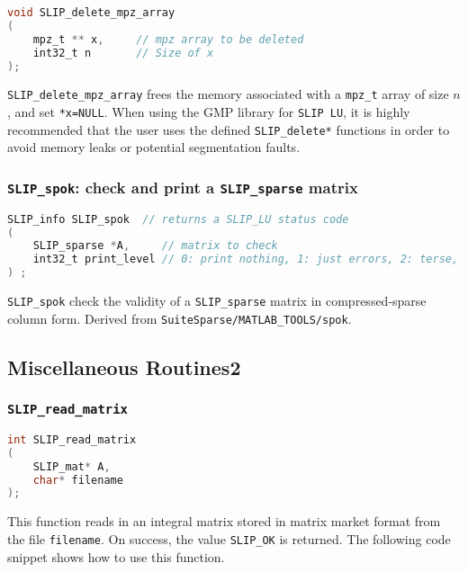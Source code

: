 \documentclass[12pt]{article}
\theoremstyle{definition}
\begin{document}
\begin{lstlisting}[language=C,frame=single]
void SLIP_delete_mpz_array
(
    mpz_t ** x,     // mpz array to be deleted
    int32_t n       // Size of x
);
\end{lstlisting}

\verb|SLIP_delete_mpz_array| frees the memory associated with a \verb|mpz_t| array of size $n$, and set \verb|*x=NULL|. When using the GMP library for \verb|SLIP LU|, it is highly recommended that the user uses the defined \verb|SLIP_delete*| functions in order to avoid memory leaks or potential segmentation faults.


\cprotect\subsubsection{\verb|SLIP_spok|: check and print a \verb|SLIP_sparse| matrix}

\begin{lstlisting}[language=C,frame=single]
SLIP_info SLIP_spok  // returns a SLIP_LU status code
(
    SLIP_sparse *A,     // matrix to check
    int32_t print_level // 0: print nothing, 1: just errors, 2: terse, 3: all
) ;
\end{lstlisting}

\verb|SLIP_spok| check the validity of a \verb|SLIP_sparse| matrix in compressed-sparse column form.  Derived from \verb|SuiteSparse/MATLAB_TOOLS/spok|.
















\subsection{Miscellaneous Routines2}
\cprotect\subsubsection{\verb|SLIP_read_matrix|}


\begin{lstlisting}[language=C,frame=single]
int SLIP_read_matrix
(
    SLIP_mat* A,
    char* filename
);
\end{lstlisting}

This function reads in an integral matrix stored in matrix market format from the file \verb|filename|. On success, the value \verb|SLIP_OK| is returned. The following code snippet shows how to use this function.
\end{document}
